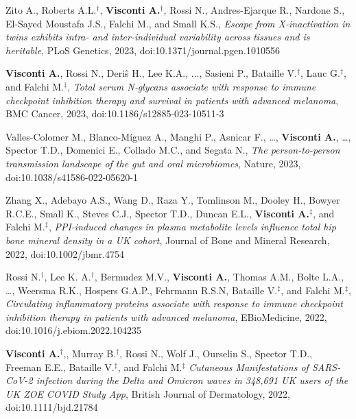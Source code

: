 {\begin{itemize}
		  Zito A., Roberts A.L.$^{\textbf{$\dag $}}$, \textbf{Visconti A.}$^{\textbf{$\dag $}}$, Rossi N., Andres-Ejarque R., Nardone S., El-Sayed Moustafa J.S., Falchi M., and Small K.S., \emph{Escape from X-inactivation in twins exhibits intra- and inter-individual variability across tissues and is heritable}, PLoS Genetics, 2023, doi:10.1371/journal.pgen.1010556
				
		 \textbf{Visconti A.}, Rossi N., Deri\^s H., Lee K.A., ..., Sasieni P., Bataille V.$^{\textbf{$\ddag $}}$,  Lauc G.$^{\textbf{$\ddag $}}$, and Falchi M.$^{\textbf{$\ddag $}}$, \emph{Total serum N‐glycans associate with response to immune checkpoint inhibition therapy and survival in patients with advanced melanoma}, BMC Cancer, 2023, doi:10.1186/s12885-023-10511-3
		
		  Valles-Colomer M., Blanco-Míguez A., Manghi P., Asnicar F., \dots, \textbf{Visconti A.}, \dots, Spector T.D., Domenici E., Collado M.C., and Segata N., \emph{The person-to-person transmission landscape of the gut and oral microbiomes}, Nature, 2023, doi:10.1038/s41586-022-05620-1
		
		 Zhang X., Adebayo A.S., Wang D., Raza Y., Tomlinson M., Dooley H., Bowyer R.C.E., Small K., Steves C.J., Spector T.D., Duncan E.L., \textbf{Visconti A.}$^{\textbf{$\ddag $}}$, and Falchi M.$^{\textbf{$\ddag $}}$, \emph{PPI-induced changes in plasma metabolite levels influence total hip bone mineral density in a UK cohort}, Journal of Bone and Mineral Research, 2022, doi:10.1002/jbmr.4754
		

  	    Rossi N.$^{\textbf{$\dag $}}$, Lee K. A.$^{\textbf{$\dag $}}$, Bermudez M.V., \textbf{Visconti A.}, Thomas A.M., Bolte L.A., \dots, Weersma R.K., Hospers G.A.P., Fehrmann R.S.N, Bataille V.$^{\textbf{$\ddag $}}$, and Falchi M.$^{\textbf{$\ddag $}}$, \emph{Circulating inflammatory proteins associate with response to immune checkpoint inhibition therapy in patients with advanced melanoma}, EBioMedicine, 2022, doi:10.1016/j.ebiom.2022.104235	
	  
	   	\textbf{Visconti A.}$^{\textbf{$\dag $}}$,, Murray B.$^{\textbf{$\dag $}}$, Rossi N., Wolf J., Ourselin S., Spector T.D., Freeman E.E., Bataille V.$^{\textbf{$\ddag $}}$, and Falchi M.$^{\textbf{$\ddag $}}$ \emph{Cutaneous Manifestations of SARS-CoV-2 infection during the Delta and Omicron waves in 348,691 UK users of the UK ZOE COVID Study App}, British Journal of Dermatology, 2022, doi:10.1111/bjd.21784
  	  

\end{itemize}}
